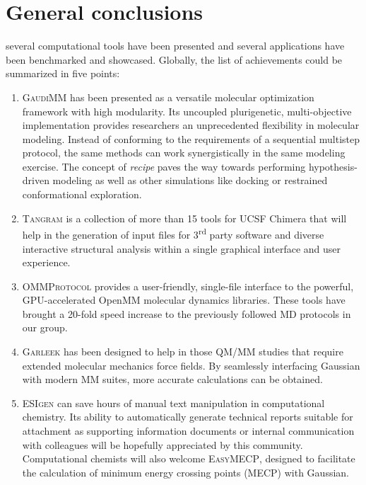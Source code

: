 \chapter{General conclusions}
\label{chap:07}

 several computational tools have been presented and several applications have been benchmarked and showcased. Globally, the list of achievements could be summarized in five points:



\begin{enumerate}
	\item \textsc{GaudiMM} has been presented as a versatile molecular optimization framework with high modularity. Its uncoupled plurigenetic, multi-objective implementation provides researchers an unprecedented flexibility in molecular modeling. Instead of conforming to the requirements of a sequential multistep protocol, the same methods can work synergistically in the same modeling exercise. The concept of \textit{recipe} paves the way towards performing hypothesis-driven modeling as well as other simulations like docking or restrained conformational exploration.

	\item \textsc{Tangram} is a collection of more than 15 tools for UCSF Chimera that will help in the generation of input files for 3\textsuperscript{rd} party software and diverse interactive structural analysis within a single graphical interface and user experience.

	\item \textsc{OMMProtocol} provides a user-friendly, single-file interface to the powerful, GPU-accelerated OpenMM molecular dynamics libraries. These tools have brought a 20-fold speed increase to the previously followed MD protocols in our group.

	\item \textsc{Garleek} has been designed to help in those QM/MM studies that require extended molecular mechanics force fields. By seamlessly interfacing Gaussian with modern MM suites, more accurate calculations can be obtained.

	\item \textsc{ESIgen} can save hours of manual text manipulation in computational chemistry. Its ability to automatically generate technical reports suitable for attachment as supporting information documents or internal communication with colleagues will be hopefully appreciated by this community. Computational chemists will also welcome \textsc{EasyMECP}, designed to facilitate the calculation of minimum energy crossing points (MECP) with Gaussian.

\end{enumerate}


